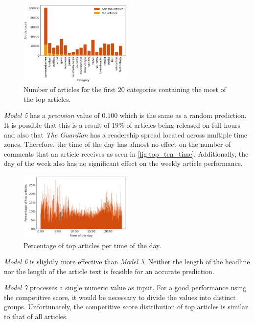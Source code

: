 \begin{figure}[h]
	\includegraphics[width=0.5\textwidth]{fig/top_ten_category.png}
	\caption{\textmd{Number of articles for the first $20$ categories containing the most of the top articles.}}
	\label{fig:top_ten_category}
\end{figure}

\textit{Model 5} has a \textit{precision} value of $0.100$ which is the same as a random prediction.
It is possible that this is a result of $19\%$ of articles being released on full hours and also that \textit{The Guardian} has a readership spread located across multiple time zones.
Therefore, the time of the day has almost no effect on the number of comments that an article receives as seen in \autoref{fig:top_ten_time}. 
Additionally, the day of the week also has no significant effect on the weekly article performance. 

\begin{figure}[h]
	\includegraphics[width=0.5\textwidth]{fig/top_ten_time.png}
	\caption{\textmd{Percentage of top articles per time of the day.}}
	\label{fig:top_ten_time}
\end{figure}

\textit{Model 6} is slightly more effective than \textit{Model 5}. 
Neither the length of the headline nor the length of the article text is feasible for an accurate prediction.

\textit{Model 7} processes a single numeric value as input. 
For a good performance using the competitive score, it would be necessary to divide the values into distinct groups.
Unfortunately, the competitive score distribution of top articles is similar to that of all articles.

